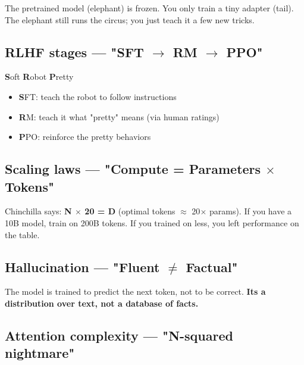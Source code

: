 \documentclass[11pt]{article}
\providecommand{\tightlist}{\setlength{\itemsep}{1pt}\setlength{\parskip}{0pt}}
\begin{document}
The pretrained model (elephant) is frozen. You only train a tiny adapter (tail). The elephant still runs the circus; you just teach it a few new tricks.

\subsection{\texorpdfstring{RLHF stages --- "SFT \(\rightarrow\) RM \(\rightarrow\) PPO"}{RLHF stages --- "SFT \textbackslash rightarrow RM \textbackslash rightarrow PPO"}}\label{rlhf-stages--sft-rightarrow-rm-rightarrow-ppo}

\textbf{S}oft \textbf{R}obot \textbf{P}retty

\begin{itemize}
\tightlist
\item
  \textbf{S}FT: teach the robot to follow instructions
\item
  \textbf{R}M: teach it what "pretty" means (via human ratings)
\item
  \textbf{P}PO: reinforce the pretty behaviors
\end{itemize}

\subsection{\texorpdfstring{Scaling laws --- "Compute = Parameters \(\times\) Tokens"}{Scaling laws --- "Compute = Parameters \textbackslash times Tokens"}}\label{scaling-laws--compute--parameters-times-tokens}

Chinchilla says: \textbf{N \(\times\) 20 = D} (optimal tokens \(\approx\) 20\(\times\) params). If you have a 10B model, train on 200B tokens. If you trained on less, you left performance on the table.

\subsection{\texorpdfstring{Hallucination --- "Fluent \(\neq\) Factual"}{Hallucination --- "Fluent \textbackslash neq Factual"}}\label{hallucination--fluent-neq-factual}

The model is trained to predict the next token, not to be correct. \textbf{It\textquotesingle s a distribution over text, not a database of facts.}

\subsection{Attention complexity --- "N-squared nightmare"}\label{attention-complexity--n-squared-nightmare}
\end{document}
